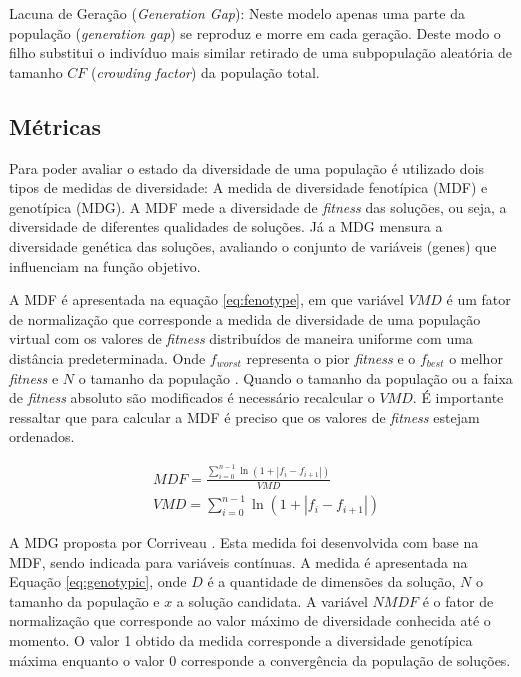 Lacuna de Geração (\textit{Generation Gap}): Neste modelo apenas uma parte da população (\textit{generation gap}) se reproduz e morre em cada geração. Deste modo o filho substitui o indivíduo mais similar retirado de uma subpopulação aleatória de tamanho $CF$ (\textit{crowding factor}) da população total. 

\subsection{Métricas}
\label{sec:evaluete_diversity}

Para poder avaliar o estado da diversidade de uma população é utilizado dois tipos de medidas de diversidade: A medida de diversidade fenotípica (MDF) e genotípica (MDG). A MDF mede a diversidade de \textit{fitness} das soluções, ou seja, a diversidade de diferentes qualidades de soluções. Já a MDG mensura a diversidade genética das soluções, avaliando o conjunto de variáveis (genes) que influenciam na função objetivo.

A MDF é apresentada na equação \ref{eq:fenotype}, em que variável $VMD$ é um fator de normalização que corresponde a medida de diversidade de uma população virtual com os valores de \textit{fitness} distribuídos de maneira uniforme com uma distância predeterminada. Onde $f_{worst}$ representa o pior \textit{fitness} e o $f_{best}$ o melhor \textit{fitness} e $N$ o tamanho da população \cite{phenotypic}. Quando o tamanho da população ou a faixa de \textit{fitness} absoluto são modificados é necessário recalcular o $VMD$. É importante ressaltar que para calcular a MDF é preciso que os valores de \textit{fitness} estejam ordenados.

\begin{equation}
\label{eq:fenotype}
\begin{split}
& MDF = \frac{\sum_{i=0}^{n-1} \ln(1 + |f_i - f_{i+1}|)}{VMD} \\
& VMD = \sum_{i=0}^{n-1} \ln(1 + |f_i - f_{i+1}|)
\end{split}
\end{equation}

A MDG  proposta por Corriveau \cite{genotypic}. Esta medida foi desenvolvida com base na MDF, sendo indicada para variáveis contínuas. A medida é apresentada na Equação \ref{eq:genotypic}, onde $D$ é a quantidade de dimensões da solução, $N$ o tamanho da população e $x$ a solução candidata. A variável
$NMDF$ é o fator de normalização que corresponde ao valor máximo de diversidade conhecida até o momento. O valor 1 obtido da medida corresponde a diversidade genotípica máxima enquanto o valor 0 corresponde a convergência da população de soluções.

